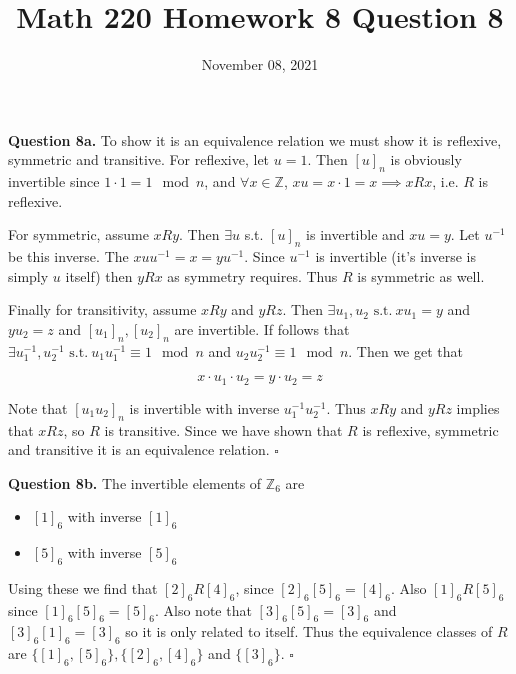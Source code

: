 \documentclass[letterpaper, reqno,11pt]{article}
\newcommand{\ZZ}{\mathbb{Z}}
\newcommand{\st}{\text{ s.t.}\ }
\begin{document}
\title{Math 220 Homework 8 Question 8}
\date{November 08, 2021}
\maketitle

{\noindent\bf Question 8a.} To show it is an equivalence relation we must show it is reflexive, symmetric and transitive. For reflexive, let $u=1$. Then $[u]_n$ is obviously invertible since $1\cdot 1=1\mod n$, and $\forall x\in\ZZ$, $xu=x\cdot 1=x\implies xRx$, i.e. $R$ is reflexive. 

For symmetric, assume $xRy$. Then $\exists u$ s.t. $[u]_n$ is invertible and $xu=y$. Let $u^{-1}$ be this inverse. The $xuu^{-1}=x=yu^{-1}$. Since $u^{-1}$ is invertible (it's inverse is simply $u$ itself) then $yRx$ as symmetry requires. Thus $R$ is symmetric as well. 

Finally for transitivity, assume $xRy$ and $yRz$. Then $\exists u_1, u_2\st xu_1=y$ and $yu_2=z$ and $[u_1]_n, [u_2]_n$ are invertible. If follows that $\exists u_1^{-1}, u_2^{-1}\st u_1u_1^{-1}\equiv 1\mod n$ and $u_2u_2^{-1}\equiv 1\mod n$. Then we get that 

\[
    x\cdot u_1\cdot u_2=y\cdot u_2=z    
\]

Note that $[u_1u_2]_n$ is invertible with inverse $u_1^{-1}u_2^{-1}$. Thus $xRy$ and $yRz$ implies that $xRz$, so $R$ is transitive. Since we have shown that $R$ is reflexive, symmetric and transitive it is an equivalence relation. $\square$

{\noindent\bf Question 8b.} The invertible elements of $\ZZ_6$ are 

\begin{itemize}
    \item $[1]_6$ with inverse $[1]_6$
    \item $[5]_6$ with inverse $[5]_6$
\end{itemize}

Using these we find that $[2]_6R[4]_6$, since $[2]_6[5]_6=[4]_6$. Also $[1]_6R[5]_6$ since $[1]_6[5]_6=[5]_6$. Also note that $[3]_6[5]_6=[3]_6$ and $[3]_6[1]_6=[3]_6$ so it is only related to itself. Thus the equivalence classes of $R$ are $\{[1]_6, [5]_6\}, \{[2]_6, [4]_6\}$ and $\{[3]_6\}$. $\square$

 
\end{document}
